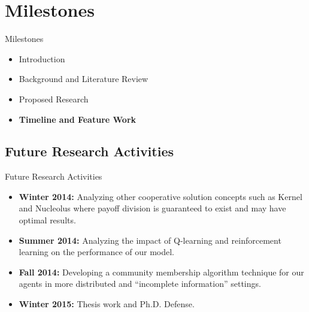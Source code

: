 \documentclass{beamer}
\begin{document}


\section{Milestones}
\begin{frame}{Milestones}
    \begin{itemize}
     	\itemsep=.5cm
    	\item Introduction
    	\item Background and Literature Review
    	\item Proposed Research
    	\item {\bf Timeline and Feature Work}
    \end{itemize}
\end{frame}

\subsection{Future Research Activities}
\begin{frame}{Future Research Activities}
    \begin{itemize}
    \item \textbf{Winter 2014: }Analyzing other cooperative solution concepts such as Kernel
    and Nucleolus where payoff division is guaranteed to exist and may
    have optimal results.

    \item \textbf{Summer 2014: }Analyzing the impact of Q-learning and reinforcement
    learning on the performance of our model.

    \item \textbf{Fall 2014: }Developing a community membership algorithm technique for
    our agents in more distributed and ``incomplete information'' settings.

    \item \textbf{Winter 2015: }Thesis work and Ph.D. Defense.
    \end{itemize}
\end{frame}
\end{document}

